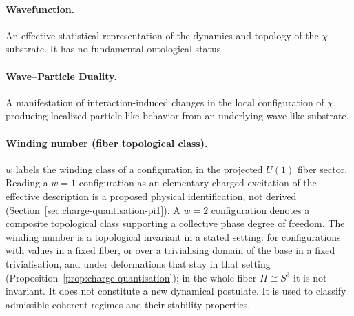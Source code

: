   \paragraph{Wavefunction.}
    An effective statistical representation of the dynamics and topology of the
    $\chi$ substrate.
    It has no fundamental ontological status.

  \paragraph{Wave--Particle Duality.}
    A manifestation of interaction-induced changes in the local configuration of
    $\chi$, producing localized particle-like behavior from an underlying
    wave-like substrate.

  \paragraph[$w$]{Winding number (fiber topological class).}
    $w$ labels the winding class of a configuration in the projected $U(1)$ fiber sector.
    Reading a $w=1$ configuration as an elementary charged excitation of the effective description is a proposed
    physical identification, not derived (Section~\ref{sec:charge-quantisation-pi1}).
    A $w=2$ configuration denotes a composite topological class supporting a collective phase degree of freedom.
    The winding number is a topological invariant in a stated setting: for configurations with values in a fixed
    fiber, or over a trivialising domain of the base in a fixed trivialisation, and under deformations that stay in
    that setting (Proposition~\ref{prop:charge-quantisation}); in the whole fiber $\Pi \cong S^3$ it is not invariant.
    It does not constitute a new dynamical postulate.
    It is used to classify admissible coherent regimes and their stability properties.
